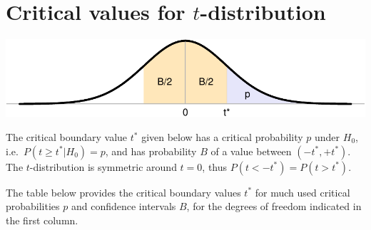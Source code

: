\documentclass[
]{book}
\begin{document}
\hypertarget{app:criticaltvalues}{%
\chapter{\texorpdfstring{Critical values for \(t\)-distribution}{Critical values for t-distribution}}\label{app:criticaltvalues}}

\includegraphics{QMS-EN_files/figure-latex/criticaltvalues-auxiliaryfigure-1.pdf}

The critical boundary value \(t^*\) given below has a critical probability \(p\)
under \(H_0\), i.e.~\(P(t \geq t^*|H_0)=p\), and has probability \(B\) of a
value between \((-t^*, +t^*)\). The \(t\)-distribution is symmetric around
\(t=0\), thus \(P(t < -t^*) = P(t > t^*)\).

The table below provides the critical boundary values \(t^*\) for much used critical probabilities \(p\) and
confidence intervals \(B\), for the degrees of freedom indicated in the first column.
\end{document}
